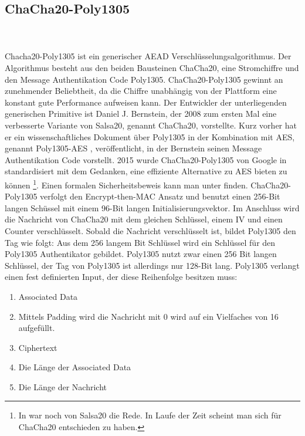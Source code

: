 \subsection{ChaCha20-Poly1305}
\label{sec:chacha20-poly1305}
\\
\\
Chacha20-Poly1305 ist ein generischer AEAD Verschlüsselungsalgorithmus. Der Algorithmus besteht aus den beiden Bausteinen ChaCha20, eine Stromchiffre und den Message Authentikation Code Poly1305. ChaCha20-Poly1305 gewinnt an zunehmender Beliebtheit, da die Chiffre unabhängig von der Plattform eine konstant gute Performance aufweisen kann. Der Entwickler der unterliegenden generischen Primitive ist Daniel J. Bernstein, der 2008 zum ersten Mal eine verbesserte Variante von Salsa20, genannt ChaCha20, vorstellte\cite{bernstein2008chacha}. Kurz vorher hat er ein wissenschaftliches Dokument über Poly1305 in der Kombination mit \gls{AES}, genannt Poly1305-AES \cite{10.1007/11502760_3}, veröffentlicht, in der Bernstein seinen Message Authentikation Code vorstellt.
2015 wurde ChaCha20-Poly1305 von Google in \cite{rfc7539} standardisiert mit dem Gedanken, eine effiziente Alternative zu AES bieten zu können \cite{AdamLangley} \footnote[13]{In \cite{AdamLangley} war noch von Salsa20 die Rede. In Laufe der Zeit scheint man sich für ChaCha20 entschieden zu haben.}. Einen formalen Sicherheitsbeweis kann man unter \cite{procter2014security} finden.
ChaCha20-Poly1305 verfolgt den Encrypt-then-MAC Ansatz und benutzt einen 256-Bit langen Schüssel mit einem 96-Bit langen Initialisierungsvektor.
Im Anschluss wird die Nachricht von ChaCha20 mit dem gleichen Schlüssel, einem \gls{IV} und einen Counter verschlüsselt.
Sobald die Nachricht verschlüsselt ist, bildet Poly1305 den Tag wie folgt: Aus dem 256 langem Bit Schlüssel wird ein Schlüssel für den Poly1305 Authentikator gebildet. Poly1305 nutzt zwar einen 256 Bit langen Schlüssel, der Tag von Poly1305 ist allerdings nur 128-Bit lang.  
Poly1305 verlangt einen fest definierten Input, der diese Reihenfolge besitzen muss:
\begin{enumerate}
\item Associated Data 
\item Mittels Padding wird die Nachricht mit 0 wird auf ein Vielfaches von 16 aufgefüllt.
\item Ciphertext
\item Die Länge der Associated Data
\item Die Länge der Nachricht
\end{enumerate}
